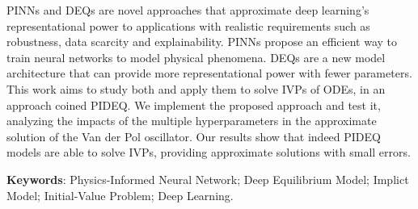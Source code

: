 
\setlength{\absparsep}{18pt} %
\begin{resumo}
	\SingleSpacing
	\Glspl{PINN} and \glspl{DEQ} are novel approaches that approximate deep learning's representational power to applications with realistic requirements such as robustness, data scarcity and explainability.
	\Glspl{PINN} propose an efficient way to train neural networks to model physical phenomena.
	\Glspl{DEQ} are a new model architecture that can provide more representational power with fewer parameters.
	This work aims to study both and apply them to solve \glspl{IVP} of \glspl{ODE}, in an approach coined \gls{PIDEQ}.
	We implement the proposed approach and test it, analyzing the impacts of the multiple hyperparameters in the approximate solution of the  Van der Pol oscillator.
	Our results show that indeed \gls{PIDEQ} models are able to solve \glspl{IVP}, providing approximate solutions with small errors.
	
	\textbf{Keywords}: Physics-Informed Neural Network; Deep Equilibrium Model; Implict Model; Initial-Value Problem; Deep Learning.
\end{resumo}


